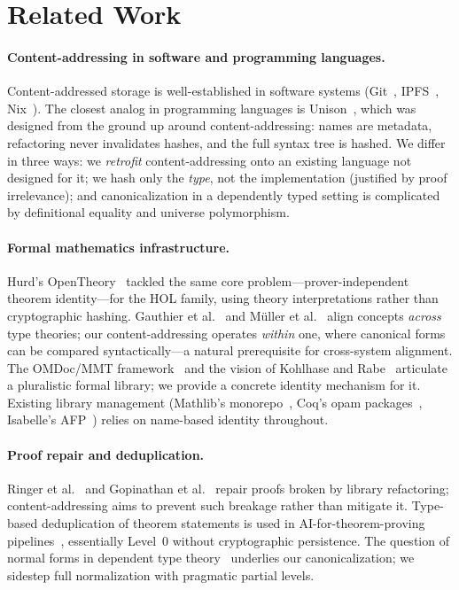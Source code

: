\section{Related Work}
\label{sec:related}

\paragraph{Content-addressing in software and programming languages.}
Content-addressed storage is well-established in software systems
(Git~\cite{git}, IPFS~\cite{benet2014ipfs},
Nix~\cite{dolstra2004nix}).  The closest analog in programming
languages is Unison~\cite{unison}, which was designed from the ground
up around content-addressing: names are metadata, refactoring never
invalidates hashes, and the full syntax tree is hashed.  We differ in
three ways: we \emph{retrofit} content-addressing onto an existing
language not designed for it; we hash only the \emph{type}, not the
implementation (justified by proof irrelevance); and canonicalization
in a dependently typed setting is complicated by definitional equality
and universe polymorphism.

\paragraph{Formal mathematics infrastructure.}
Hurd's OpenTheory~\cite{hurd2011opentheory} tackled the same core
problem---prover-independent theorem identity---for the HOL family,
using theory interpretations rather than cryptographic hashing.
Gauthier et al.~\cite{gauthier2019aligning} and M\"uller et
al.~\cite{muller2017alignment} align concepts \emph{across} type
theories; our content-addressing operates \emph{within} one, where
canonical forms can be compared syntactically---a natural prerequisite
for cross-system alignment.  The OMDoc/MMT
framework~\cite{rabe2013scalable, kohlhase2006omdoc} and the vision of
Kohlhase and Rabe~\cite{kohlhase2017qed} articulate a pluralistic
formal library; we provide a concrete identity mechanism for it.
Existing library management (Mathlib's monorepo~\cite{mathlib4}, Coq's
opam packages~\cite{coq}, Isabelle's AFP~\cite{isabelle_afp}) relies
on name-based identity throughout.

\paragraph{Proof repair and deduplication.}
Ringer et al.~\cite{ringer2021repair} and Gopinathan et
al.~\cite{gopinathan2023repair} repair proofs broken by library
refactoring; content-addressing aims to prevent such breakage rather
than mitigate it.  Type-based deduplication of theorem statements is
used in AI-for-theorem-proving pipelines~\cite{syntheticthm},
essentially Level~0 without cryptographic persistence.  The question of
normal forms in dependent type theory~\cite{abel2018decidability,
coquand1991algorithm} underlies our canonicalization; we sidestep full
normalization with pragmatic partial levels.

